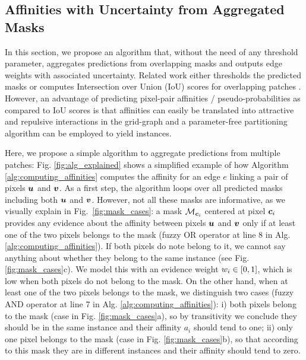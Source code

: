 \subsection{Affinities with Uncertainty from Aggregated Masks}\label{sec:aggr_affs}
In this section, we propose an algorithm that, without the need of any threshold parameter, aggregates predictions from overlapping \maskname masks and outputs edge weights with associated uncertainty.
Related work either thresholds the predicted \maskname masks \cite{januszewski2018high,hirsch2020patchperpix,meirovitch2016multi} or computes Intersection over Union (IoU) scores for overlapping patches \cite{liu2016multi}. However, an advantage of predicting pixel-pair affinities / pseudo-probabilities as compared to IoU scores is that affinities can easily be translated into attractive and repulsive interactions in the grid-graph 
and a parameter-free partitioning algorithm can be employed to yield instances.

Here, we propose a simple algorithm to aggregate predictions from multiple patches: Fig. \ref{fig:alg_explained} shows a simplified example of how Algorithm \ref{alg:computing_affinities} computes the affinity for an edge $e$ linking a pair of pixels $\bm{u}$ and $\bm{v}$.
As a first step, the algorithm loops over all predicted \maskname masks including both $\bm{u}$ and $\bm{v}$. 
However, not all these masks are informative, as we visually explain in Fig.~\ref{fig:mask_cases}: a mask $\mathcal{M}_{\bm{c}_i}$ centered at pixel $\bm{c}_i$ provides any evidence about the affinity between pixels $\bm{u}$ and $\bm{v}$ only if at least one of the two pixels belongs to the mask (fuzzy OR operator at line 8 in Alg. \ref{alg:computing_affinities}).
If both pixels do note belong to it, we cannot say anything about whether they belong to the same instance (see Fig. \ref{fig:mask_cases}c). We model this with an evidence weight $w_i\in[0,1]$, which is low when both pixels do not belong to the mask.
On the other hand, when at least one of the two pixels belongs to the mask, we distinguish two cases (fuzzy AND operator at line 7 in Alg. \ref{alg:computing_affinities}): i)
both pixels belong to the mask  (case in Fig. \ref{fig:mask_cases}a), so by transitivity we conclude they should be in the same instance and their affinity $a_i$ should tend to one; 
ii) only one pixel belongs to the mask (case in Fig. \ref{fig:mask_cases}b), so that according to this mask they are in different instances and their affinity should tend to zero. 

